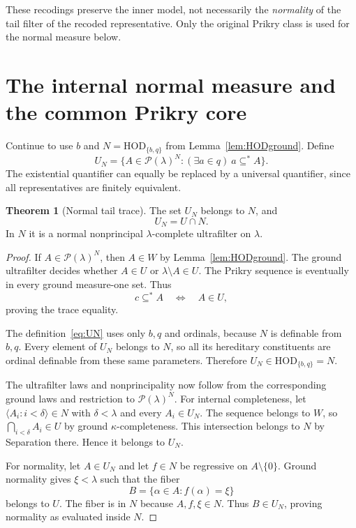 \documentclass[11pt,letterpaper]{article}
\theoremstyle{definition}
\newtheorem{theorem}[definition]{Theorem}
\numberwithin{equation}{section}
\newcommand{\HOD}{\mathrm{HOD}}
\begin{document}
These recodings preserve the inner model, not necessarily the \emph{normality} of the tail filter of the recoded representative. Only the original Prikry class is used for the normal measure below.

\section{The internal normal measure and the common Prikry core}\label{sec:core}

Continue to use $b$ and $N=\HOD_{\{b,q\}}$ from Lemma~\ref{lem:HODground}. Define
\begin{equation}\label{eq:UN}
 U_N=\{A\in\mathcal P(\lambda)^N:
                   (\exists a\in q)\ a\subseteq^*A\}.
\end{equation}
The existential quantifier can equally be replaced by a universal quantifier, since all representatives are finitely equivalent.

\begin{theorem}[Normal tail trace]\label{thm:normal}
The set $U_N$ belongs to $N$, and
\[
 U_N=U\cap N.
\]
In $N$ it is a normal nonprincipal $\lambda$-complete ultrafilter on $\lambda$.
\end{theorem}
\begin{proof}
If $A\in\mathcal P(\lambda)^N$, then $A\in W$ by Lemma~\ref{lem:HODground}. The ground ultrafilter decides whether $A\in U$ or $\lambda\setminus A\in U$. The Prikry sequence is eventually in every ground measure-one set. Thus
\[
 c\subseteq^*A\quad\Longleftrightarrow\quad A\in U,
\]
proving the trace equality.

The definition~\eqref{eq:UN} uses only $b,q$ and ordinals, because $N$ is definable from $b,q$. Every element of $U_N$ belongs to $N$, so all its hereditary constituents are ordinal definable from these same parameters. Therefore $U_N\in\HOD_{\{b,q\}}=N$.

The ultrafilter laws and nonprincipality now follow from the corresponding ground laws and restriction to $\mathcal P(\lambda)^N$. For internal completeness, let $\langle A_i:i<\delta\rangle\in N$ with $\delta<\lambda$ and every $A_i\in U_N$. The sequence belongs to $W$, so $\bigcap_{i<\delta}A_i\in U$ by ground $\kappa$-completeness. This intersection belongs to $N$ by Separation there. Hence it belongs to $U_N$.

For normality, let $A\in U_N$ and let $f\in N$ be regressive on $A\setminus\{0\}$. Ground normality gives $\xi<\lambda$ such that the fiber
\[
 B=\{\alpha\in A:f(\alpha)=\xi\}
\]
belongs to $U$. The fiber is in $N$ because $A,f,\xi\in N$. Thus $B\in U_N$, proving normality as evaluated inside $N$.
\end{proof}
\end{document}
